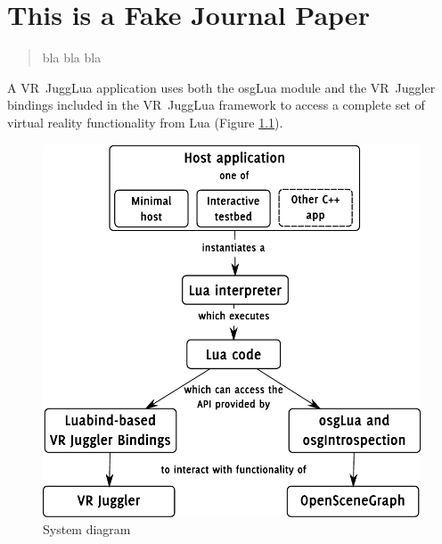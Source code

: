 \documentclass[capstoc,capschap,draftcls]{rpisudiss}
\begin{document}
\chapter{This is a Fake Journal Paper}








\begin{abstract}
 bla bla bla
\end{abstract}

A VR~JuggLua application uses both the osgLua module
and the VR~Juggler bindings included in the VR~JuggLua framework
to access a complete set of virtual reality functionality from Lua
(Figure \ref{fig:System-diagram}).
\begin{figure}
    \centering
    \includegraphics[width=1\columnwidth]{accessdiagram}
    \caption{\label{fig:System-diagram}System diagram}
\end{figure}
\end{document}
